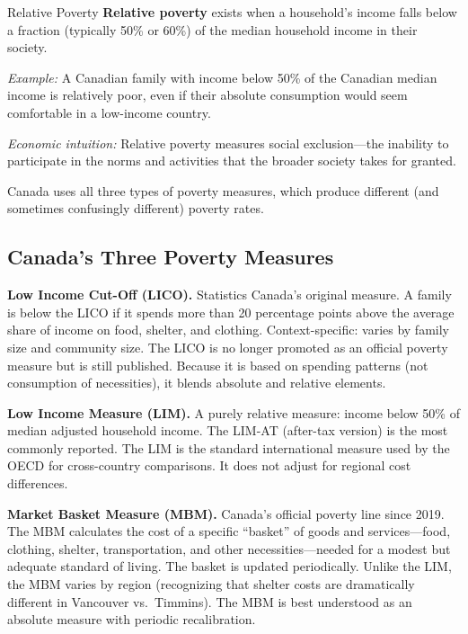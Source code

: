 \begin{defbox}{Relative Poverty}
\textbf{Relative poverty} exists when a household's income falls below a fraction (typically 50\% or 60\%) of the median household income in their society.

\textit{Example:} A Canadian family with income below 50\% of the Canadian median income is relatively poor, even if their absolute consumption would seem comfortable in a low-income country.

\textit{Economic intuition:} Relative poverty measures social exclusion---the inability to participate in the norms and activities that the broader society takes for granted.
\end{defbox}

Canada uses all three types of poverty measures, which produce different (and sometimes confusingly different) poverty rates.

\subsection{Canada's Three Poverty Measures}

\textbf{Low Income Cut-Off (LICO).} Statistics Canada's original measure. A family is below the LICO if it spends more than 20 percentage points above the average share of income on food, shelter, and clothing. Context-specific: varies by family size and community size. The LICO is no longer promoted as an official poverty measure but is still published. Because it is based on spending patterns (not consumption of necessities), it blends absolute and relative elements.

\textbf{Low Income Measure (LIM).} A purely relative measure: income below 50\% of median adjusted household income. The LIM-AT (after-tax version) is the most commonly reported. The LIM is the standard international measure used by the OECD for cross-country comparisons. It does not adjust for regional cost differences.

\textbf{Market Basket Measure (MBM).} Canada's official poverty line since 2019. The MBM calculates the cost of a specific ``basket'' of goods and services---food, clothing, shelter, transportation, and other necessities---needed for a modest but adequate standard of living. The basket is updated periodically. Unlike the LIM, the MBM varies by region (recognizing that shelter costs are dramatically different in Vancouver vs.\ Timmins). The MBM is best understood as an absolute measure with periodic recalibration.

